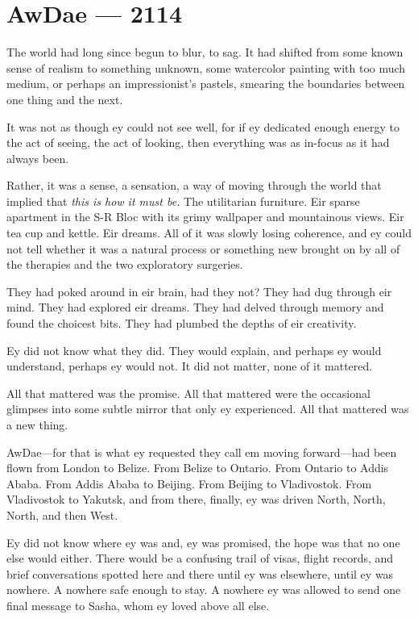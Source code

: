 \hypertarget{awdae-2114}{%
\chapter{AwDae — 2114}}

\noindent The world had long since begun to blur, to sag. It had shifted from some known sense of realism to something unknown, some watercolor painting with too much medium, or perhaps an impressionist's pastels, smearing the boundaries between one thing and the next.

It was not as though ey could not see well, for if ey dedicated enough energy to the act of seeing, the act of looking, then everything was as in-focus as it had always been.

Rather, it was a sense, a sensation, a way of moving through the world that implied that \emph{this is how it must be.} The utilitarian furniture. Eir sparse apartment in the S-R Bloc with its grimy wallpaper and mountainous views. Eir tea cup and kettle. Eir dreams. All of it was slowly losing coherence, and ey could not tell whether it was a natural process or something new brought on by all of the therapies and the two exploratory surgeries.

They had poked around in eir brain, had they not? They had dug through eir mind. They had explored eir dreams. They had delved through memory and found the choicest bits. They had plumbed the depths of eir creativity.

Ey did not know what they did. They would explain, and perhaps ey would understand, perhaps ey would not. It did not matter, none of it mattered.

All that mattered was the promise. All that mattered were the occasional glimpses into some subtle mirror that only ey experienced. All that mattered was a new thing.

AwDae—for that is what ey requested they call em moving forward—had been flown from London to Belize. From Belize to Ontario. From Ontario to Addis Ababa. From Addis Ababa to Beijing. From Beijing to Vladivostok. From Vladivostok to Yakutsk, and from there, finally, ey was driven North, North, North, and then West.

Ey did not know where ey was and, ey was promised, the hope was that no one else would either. There would be a confusing trail of visas, flight records, and brief conversations spotted here and there until ey was elsewhere, until ey was nowhere. A nowhere safe enough to stay. A nowhere ey was allowed to send one final message to Sasha, whom ey loved above all else.

